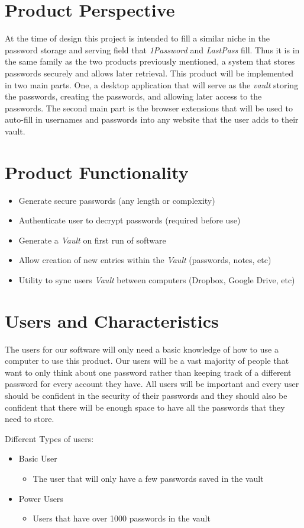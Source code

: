 \documentclass[11pt]{report}
\begin{document}
\section{Product Perspective}
At the time of design this project is intended to fill a similar
niche in the password storage and serving field that \textit{1Password}
and \textit{LastPass} fill. Thus it is in the same family as
the two products previously mentioned, a system that stores passwords
securely and allows later retrieval. This product will be implemented in
two main parts. One, a desktop application that will serve as the \textit{vault}
storing the passwords, creating the passwords, and allowing later access
to the passwords. The second main part is the browser extensions that
will be used to auto-fill in usernames and passwords into any website
that the user adds to their vault. 

\section{Product Functionality}

\begin{itemize}
    \item Generate secure passwords (any length or complexity)
    \item Authenticate user to decrypt passwords (required before use)
    \item Generate a \textit{Vault} on first run of software
    \item Allow creation of new entries within the \textit{Vault} (passwords, notes, etc)
    \item Utility to sync users \textit{Vault} between computers (Dropbox, Google Drive, etc)
\end{itemize}

\section{Users and Characteristics}
The users for our software will only need a basic knowledge of how to use 
a computer to use this product. Our users will be a vast majority of people 
that want to only think about one password rather than keeping track of a 
different password for every account they have. All users will be important 
and every user should be confident in the security of their passwords and 
they should also be confident that there will be enough space to have all 
the passwords that they need to store.

Different Types of users:
\begin{itemize}
    \item Basic User
        \begin{itemize}
            \item The user that will only have a few passwords saved in the vault
        \end{itemize}
    \item Power Users
        \begin{itemize}
            \item Users that have over 1000 passwords in the vault
        \end{itemize}
\end{itemize}
\end{document}
